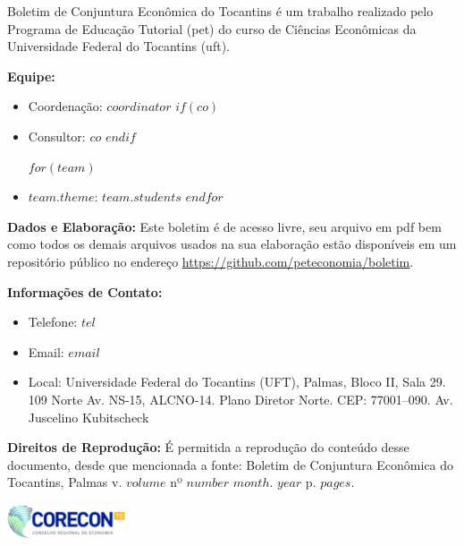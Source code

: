 \documentclass[twocolumn, a4paper, 10pt]{report}
\newcommand{\abbr}[1]{\acrshort{#1}}
\begin{document}
    \newpage\null\thispagestyle{empty}\newpage\clearpage


    \begin{tcolorbox}[colback=boxbackground, colframe=boxbackground, arc=0mm, top=15pt]
        Boletim de Conjuntura Econômica do Tocantins é um trabalho realizado pelo Programa de Educação Tutorial (\abbr{pet}) do curso de Ciências Econômicas da Universidade Federal do Tocantins (\abbr{uft}).
        \\
        \par{\bf Equipe:}
        \begin{itemize}
        \item{Coordenação:} $coordinator$
        $if(co)$\item{Consultor:} $co$ $endif$

        $for(team)$
        \item{$team.theme$:} $team.students$
        $endfor$
        \end{itemize}
        \par{\bf Dados e Elaboração:}
            Este boletim é de acesso livre, seu arquivo em pdf bem como todos os demais arquivos usados na sua elaboração estão disponíveis em um repositório público no endereço \href{https://github.com/peteconomia/boletim}{https://github.com/peteconomia/boletim}.
        \\
        \par{\bf Informações de Contato:}
        \begin{itemize}
            \item{Telefone:} $tel$
            \item{Email:} $email$
            \item{Local:} Universidade Federal do Tocantins (UFT), Palmas, Bloco II, Sala 29. 109 Norte Av. NS-15, ALCNO-14. Plano Diretor Norte. CEP: 77001--090. Av. Juscelino Kubitscheck
        \end{itemize}
        \par{\bf Direitos de Reprodução:}
        É permitida a reprodução do conteúdo desse documento, desde que mencionada a fonte: Boletim de Conjuntura Econômica do Tocantins, Palmas v. $volume$ nº $number$ $month$. $year$ p. $pages$.
    \end{tcolorbox}

    \vspace{\fill}
    \begin{center}
        \includegraphics[width=3.5cm]{images/corecon.png}
    \end{center}
\end{document}
